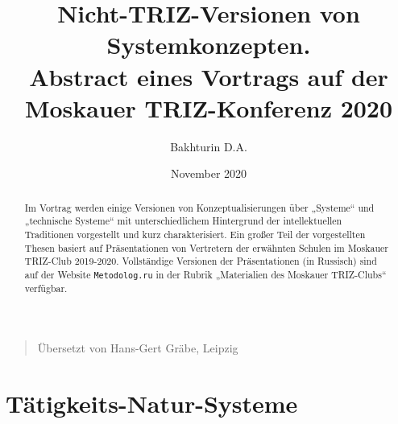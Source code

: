 \documentclass[11pt,a4paper]{article}
\title{Nicht-TRIZ-Versionen von Systemkonzepten.\\[1em] \Large Abstract eines
  Vortrags auf der Moskauer TRIZ-Konferenz 2020}
\author{Bakhturin D.A.}
\date{November 2020}
\begin{document}
\maketitle
\tableofcontents

\begin{quote}
  Übersetzt von Hans-Gert Gräbe, Leipzig
\end{quote}

\begin{abstract}
  Im Vortrag werden einige Versionen von Konzeptualisierungen über „Systeme“
  und „technische Systeme“ mit unterschiedlichem Hintergrund der
  intellektuellen Traditionen vorgestellt und kurz charakterisiert. Ein großer
  Teil der vorgestellten Thesen basiert auf Präsentationen von Vertretern der
  erwähnten Schulen im Moskauer TRIZ-Club 2019-2020. Vollständige Versionen
  der Präsentationen (in Russisch) sind auf der Website \texttt{Metodolog.ru}
  in der Rubrik „Materialien des Moskauer TRIZ-Clubs“ verfügbar.
\end{abstract}

\section{Tätigkeits-Natur-Systeme}
\end{document}
